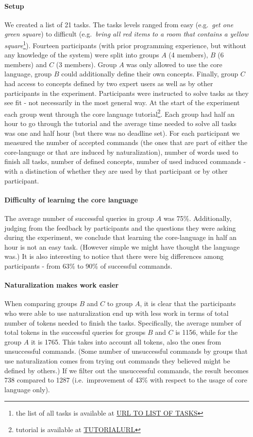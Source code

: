 \paragraph*{\textbf{Setup}} We created a list of 21 tasks. The tasks levels ranged from easy (e.g.\  \emph{get one green square}) to difficult (e.g.\ \emph{bring all red items to a room that contains a yellow square}\footnote{the list of all tasks is available at \url{URL TO LIST OF TASKS}}). Fourteen participants (with prior programming experience, but without any knowledge of the system) were split into groups $A$ (4 members), $B$ (6 members) and $C$ (3 members). Group $A$ was only allowed to use the core language, group $B$ could additionally define their own concepts. Finally, group $C$ had access to concepts defined by two expert users as well as by other participants in the experiment. Participants were instructed to solve tasks as they see fit - not necessarily in the most general way. At the start of the experiment each group went through the core language tutorial\footnote{tutorial is available at \url{TUTORIALURL}}. Each group had half an hour to go through the tutorial and the average time needed to solve all tasks was one and half hour (but there was no deadline set). For each participant we measured the number of accepted commands (the ones that are part of either the core-language or that are induced by naturalization), number of words used to finish all tasks, number of defined concepts, number of used induced commands - with a distinction of whether they are used by that participant or by other participant.
\paragraph*{\textbf{Difficulty of learning the core language}} The average number of successful queries in group $A$ was 75\%. Additionally, judging from the feedback by participants and the questions they were asking during the experiment, we conclude that learning the core-language in half an hour is not an easy task. (However simple we might have thought the language was.) It is also interesting to notice that there were big differences among participants - from 63\% to 90\% of successful commands.
\paragraph*{\textbf{Naturalization makes work easier}} When comparing groups $B$ and $C$ to group $A$, it is clear that the participants who were able to use naturalization end up with less work in terms of total number of tokens needed to finish the tasks. Specifically, the average number of total tokens in the successful queries for groups $B$ and $C$ is 1156, while for the group $A$ it is 1765. This takes into account all tokens, also the ones from unsuccessful commands. (Some number of unsuccessful commands by groups that use naturalization comes from trying out commands they believed might be defined by others.) If we filter out the unsuccessful commands, the result becomes 738 compared to 1287 (i.e.\ improvement of 43\% with respect to the usage of core language only).
